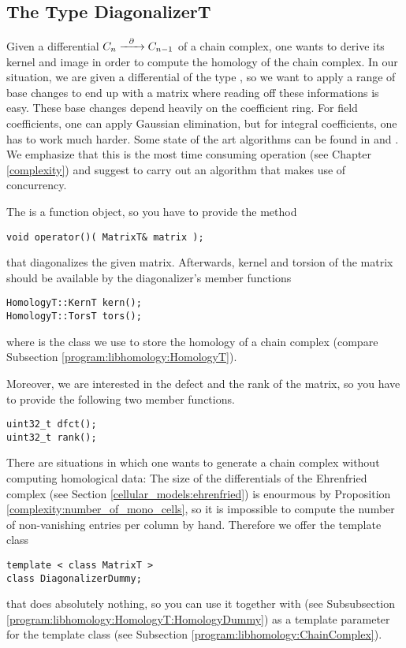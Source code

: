 \subsection{The Type DiagonalizerT}
\label{program:libhomology:DiagonalizerT}
Given a differential $C_n \xrightarrow{\hspace{6pt}{\partial}\hspace{6pt}} C_{n-1}$ of a chain complex, one wants to derive its kernel and image in order to compute the homology of the chain complex.
In our situation, we are given a differential of the type , so we want to apply a range of base changes to end up with a matrix where reading off these informations is easy.
These base changes depend heavily on the coefficient ring.
For field coefficients, one can apply Gaussian elimination, but for integral coefficients, one has to work much harder.
Some state of the art algorithms can be found in \cite{Jaeger2003} and \cite{Jaeger2009}.
We emphasize that this is the most time consuming operation (see Chapter \ref{complexity}) and suggest to carry out an algorithm that makes use of concurrency.

The  is a function object, so you have to provide the method
\begin{lstlisting}
void operator()( MatrixT& matrix );
\end{lstlisting}
that diagonalizes the given matrix.
Afterwards, kernel and torsion of the matrix should be available by the diagonalizer's member functions
\begin{lstlisting}
HomologyT::KernT kern();
HomologyT::TorsT tors();
\end{lstlisting}
where  is the class we use to store the homology of a chain complex (compare Subsection \ref{program:libhomology:HomologyT}).

Moreover, we are interested in the defect and the rank of the matrix, so you have to provide the following two member functions.
\begin{lstlisting}
uint32_t dfct();
uint32_t rank();
\end{lstlisting}

\label{program:libhomology:DiagonalizerT:DiagonalizerDummy}

There are situations in which one wants to generate a chain complex without computing homological data:
The size of the differentials of the Ehrenfried complex (see Section \ref{cellular_models:ehrenfried}) is enourmous by Proposition \ref{complexity:number_of_mono_cells},
so it is impossible to compute the number of non-vanishing entries per column by hand.
Therefore we offer the template class
\begin{lstlisting}
template < class MatrixT >
class DiagonalizerDummy;
\end{lstlisting}
that does absolutely nothing, so you can use it together with  (see Subsubsection \ref{program:libhomology:HomologyT:HomologyDummy})
as a template parameter for the template class  (see Subsection \ref{program:libhomology:ChainComplex}).

